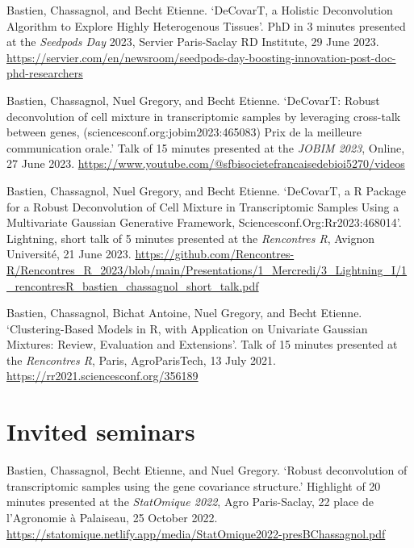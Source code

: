 Bastien, Chassagnol, and Becht Etienne. ‘DeCovarT, a Holistic Deconvolution Algorithm to Explore Highly Heterogenous Tissues’. PhD in 3 minutes presented at the \emph{Seedpods Day} 2023, Servier Paris-Saclay \acrshort{RD} Institute, 29 June 2023. 
\url{https://servier.com/en/newsroom/seedpods-day-boosting-innovation-post-doc-phd-researchers}
\newline


Bastien, Chassagnol, Nuel Gregory, and Becht Etienne. ‘DeCovarT: Robust deconvolution of cell mixture in transcriptomic samples by leveraging cross-talk between genes, (sciencesconf.org:jobim2023:465083) Prix de la meilleure communication orale.’ Talk of 15 minutes presented at the \emph{JOBIM 2023}, Online, 27 June 2023.
 \url{https://www.youtube.com/@sfbisocietefrancaisedebioi5270/videos}
\newline


Bastien, Chassagnol, Nuel Gregory, and Becht Etienne. ‘DeCovarT, a R Package for a Robust Deconvolution of Cell Mixture in Transcriptomic Samples Using a Multivariate Gaussian Generative Framework, Sciencesconf.Org:Rr2023:468014’. Lightning, short talk of 5 minutes presented at the \emph{Rencontres R}, Avignon Université, 21 June 2023.
\url{https://github.com/Rencontres-R/Rencontres_R_2023/blob/main/Presentations/1_Mercredi/3_Lightning_I/1_rencontresR_bastien_chassagnol_short_talk.pdf}\newline


Bastien, Chassagnol, Bichat Antoine, Nuel Gregory, and Becht Etienne. ‘Clustering-Based Models in R, with Application on Univariate Gaussian Mixtures: Review, Evaluation and Extensions’. Talk of 15 minutes presented at the \emph{Rencontres R}, Paris, AgroParisTech, 13 July 2021. 
\url{https://rr2021.sciencesconf.org/356189}

\newpage

\section{Invited seminars}

Bastien, Chassagnol, Becht Etienne, and Nuel Gregory. ‘Robust deconvolution of transcriptomic samples using the gene covariance structure.’ Highlight of 20 minutes presented at the \emph{StatOmique 2022}, Agro Paris-Saclay, 22 place de l’Agronomie à Palaiseau, 25 October 2022. 
\url{https://statomique.netlify.app/media/StatOmique2022-presBChassagnol.pdf}\newline



